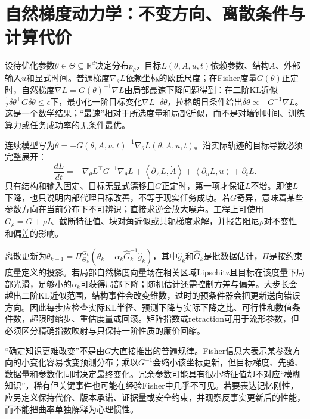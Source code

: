 \section{自然梯度动力学：不变方向、离散条件与计算代价}
\label{sec:section_4509}

设待优化参数$\theta\in\Theta\subseteq\mathbb R^d$决定分布$p_\theta$，目标$L(\theta,A,u,t)$依赖参数、结构$A$、外部输入$u$和显式时间。普通梯度$\nabla_\theta L$依赖坐标的欧氏尺度；在Fisher度量$G(\theta)$正定时，自然梯度$\widetilde\nabla L=G(\theta)^{-1}\nabla L$由局部最速下降问题得到：在二阶KL近似$\frac12\delta\theta^\top G\delta\theta\leq\epsilon$下，最小化一阶目标变化$\nabla L^\top\delta\theta$，拉格朗日条件给出$\delta\theta\propto-G^{-1}\nabla L$。这是一个数学结果；“最速”相对于所选度量和局部近似，而不是对墙钟时间、训练算力或任务成功率的无条件最优。

连续模型写为$\dot\theta=-G(\theta,A,u,t)^{-1}\nabla_\theta L(\theta,A,u,t)$。沿实际轨迹的目标导数必须完整展开：
\begin{equation}
\frac{dL}{dt}=-\nabla_\theta L^\top G^{-1}\nabla_\theta L
+\left\langle\partial_A L,\dot A\right\rangle
+\left\langle\partial_u L,\dot u\right\rangle+\partial_tL.
\label{eq:natural_gradient_total_derivative}
\end{equation}
只有结构和输入固定、目标无显式漂移且$G$正定时，第一项才保证$L$不增。即使$L$下降，也只说明内部代理目标改善，不等于现实任务成功。若$G$奇异，意味着某些参数方向在当前分布下不可辨识；直接求逆会放大噪声。工程上可使用$G_\rho=G+\rho I$、截断特征值、块对角近似或共轭梯度求解，并报告阻尼$\rho$对不变性和偏差的影响。

离散更新为$\theta_{k+1}=\Pi_{\Theta_k}^{G_k}(\theta_k-\alpha_k\widehat G_k^{-1}\widehat g_k)$，其中$\widehat g_k$和$\widehat G_k$是批数据估计，$\Pi$是按约束度量定义的投影。若局部自然梯度向量场在相关区域Lipschitz且目标在该度量下局部光滑，足够小的$\alpha_k$可获得局部下降；随机估计还需控制方差与偏差。大步长会越出二阶KL近似范围，结构事件会改变维数，过时的预条件器会把更新送向错误方向。因此每步应检查实际KL半径、预测下降与实际下降之比、可行性和数值条件数，超限时缩步、重估度量或回滚。矩阵指数或retraction可用于流形参数，但必须区分精确指数映射与只保持一阶性质的廉价回缩。

“确定知识更难改变”不是由$G$大直接推出的普遍规律。Fisher信息大表示某参数方向的小变化容易改变预测分布；乘以$G^{-1}$会缩小该坐标更新，但目标梯度、先验、数据量和参数化同时决定最终变化。冗余参数可能具有很小特征值却不对应“模糊知识”，稀有但关键事件也可能在经验Fisher中几乎不可见。若要表达记忆刚性，应另定义保持代价、版本承诺、证据量或安全约束，并观察反事实更新后的性能，而不能把曲率单独解释为心理惯性。

